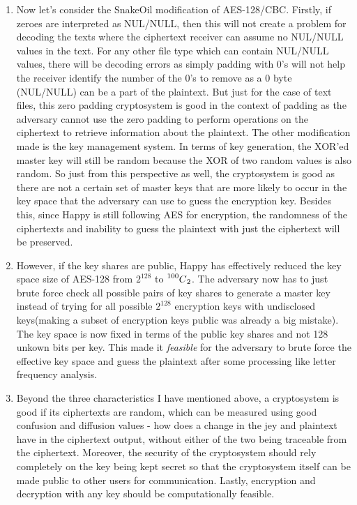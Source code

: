 \documentclass{ashoka-crypto}
\newcommand\comb[2][^n]{\prescript{#1\mkern-0.5mu}{}C_{#2}}
\begin{document}
\begin{enumerate}[label=(\alph*)]
\item Now let's consider the SnakeOil modification of AES-128/CBC. Firstly, if zeroes are interpreted as NUL/NULL, then this will not create a problem for decoding the texts where the ciphertext receiver can assume no NUL/NULL values in the text. For any other file type which can contain NUL/NULL values, there will be decoding errors as simply padding with 0's will not help the receiver identify the number of the 0's to remove as a 0 byte (NUL/NULL) can be a part of the plaintext. But just for the case of text files, this zero padding cryptosystem is good in the context of padding as the adversary cannot use the zero padding to perform operations on the ciphertext to retrieve information about the plaintext. The other modification made is the key management system. In terms of key generation, the XOR'ed master key will still be random because the XOR of two random values is also random. So just from this perspective as well, the cryptosystem is good as there are not a certain set of master keys that are more likely to occur in the key space that the adversary can use to guess the encryption key. Besides this, since Happy is still following AES for encryption, the randomness of the ciphertexts and inability to guess the plaintext with just the ciphertext will be preserved.
\item However, if the key shares are public, Happy has effectively reduced the key space size of AES-128 from $2^{128}$ to $\comb[100]{2}$. The adversary now has to just brute force check all possible pairs of key shares to generate a master key instead of trying for all possible $2^{128}$ encryption keys with undisclosed keys(making a subset of encryption keys public was already a big mistake). The key space is now fixed in terms of the public key shares and not 128 unkown bits per key. This made it \textit{feasible} for the adversary to brute force the effective key space and guess the plaintext after some processing like letter frequency analysis.
\item Beyond the three characteristics I have mentioned above, a cryptosystem is good if its ciphertexts are random, which can be measured using good confusion and diffusion values - how does a change in the jey and plaintext have in the ciphertext output, without either of the two being traceable from the ciphertext. Moreover, the security of the cryptosystem should rely completely on the key being kept secret so that the cryptosystem itself can be made public to other users for communication. Lastly, encryption and decryption with any key should be computationally feasible.
\end{enumerate}
\end{document}
